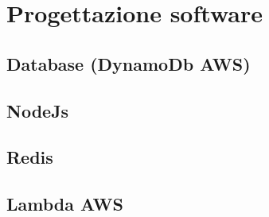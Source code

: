 \chapter{Progettazione software}

\section{Database (DynamoDb AWS)}

\section{NodeJs}

\section{Redis}

\section{Lambda AWS}



